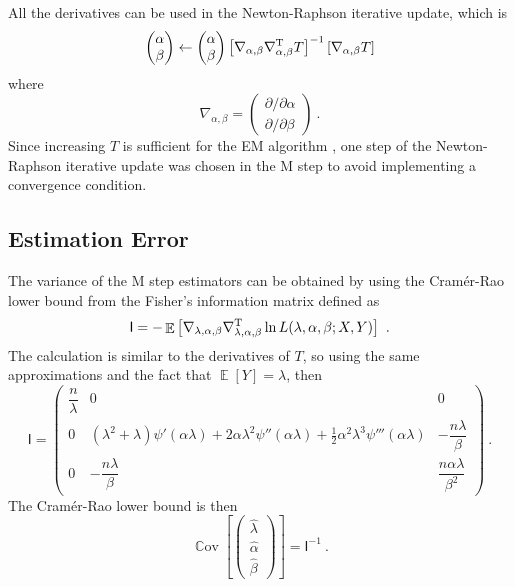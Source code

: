 \documentclass[12pt, a4paper]{memoir}
\DeclareMathOperator{\expectation}{\mathbb{E}}
\DeclareMathOperator{\cov}{\mathbb{C}ov}
\newcommand{\T}{^\textup{T}}
\newcommand{\matr}[1]{\mathsf{#1}}
\begin{document}
All the derivatives can be used in the Newton-Raphson iterative update, which is
\begin{equation}
\begin{pmatrix}
\alpha \\ \beta
\end{pmatrix}
\leftarrow
\begin{pmatrix}
\alpha \\ \beta
\end{pmatrix}
\left[
	\nabla_{\alpha,\beta}\nabla_{\alpha,\beta}\T T
\right]^{-1}
\left[\nabla_{\alpha,\beta} T\right]
\end{equation}
where
\begin{equation}
\nabla_{\alpha,\beta}=
\begin{pmatrix}
	{\partial}/{\partial \alpha}
	\\
	{\partial}/{\partial \beta}
\end{pmatrix} \ .
\end{equation}
Since increasing $T$ is sufficient for the EM algorithm \citep{dempster1977maximum}, one step of the Newton-Raphson iterative update was chosen in the M step to avoid implementing a convergence condition.

\subsection{Estimation Error}

The variance of the M step estimators can be obtained by using the Cram\'er-Rao lower bound \citep{rao1945information} \citep{cramer1946mathematical} from the Fisher's information matrix defined as
\begin{equation}
\matr{I} = -\expectation\left[
\nabla_{\lambda,\alpha,\beta}\nabla_{\lambda,\alpha,\beta}\T \ln L(\lambda,\alpha,\beta;X,Y)
\right] \ .
\end{equation}
The calculation is similar to the derivatives of $T$, so using the same approximations and the fact that $\expectation[Y]=\lambda$, then
\begin{equation}
\matr{I}
=
\begin{pmatrix}
\dfrac{n}{\lambda} & 0 & 0 \\
0 & (\lambda^2+\lambda)\psi'(\alpha\lambda)+2\alpha\lambda^2\psi''(\alpha\lambda)+\frac{1}{2}\alpha^2\lambda^3\psi'''(\alpha\lambda) & -\dfrac{n\lambda}{\beta}\\
0 & -\dfrac{n\lambda}{\beta} & \dfrac{n\alpha\lambda}{\beta^2}
\end{pmatrix} \ .
\end{equation}
The Cram\'er-Rao lower bound is then
\begin{equation}
\cov\left[
\begin{pmatrix}
\widehat{\lambda}\\\widehat{\alpha}\\\widehat{\beta}
\end{pmatrix}
\right]
= \matr{I}^{-1} \ .
\end{equation}
\end{document}
